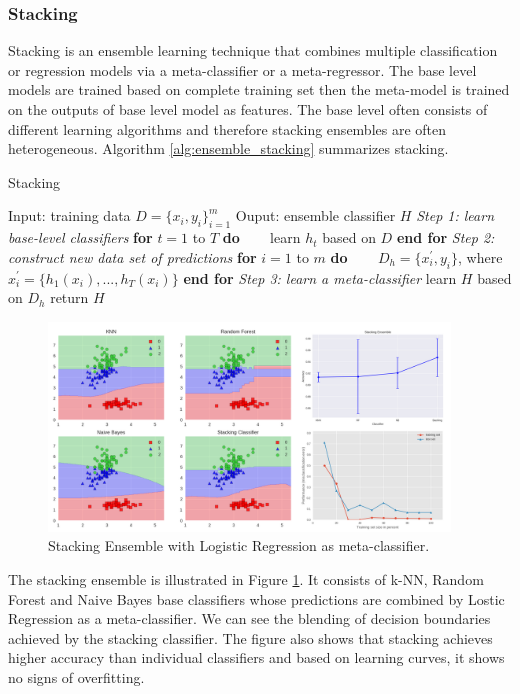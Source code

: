\subsubsection{Stacking}

Stacking is an ensemble learning technique that combines multiple classification or regression models via a meta-classifier or a meta-regressor. The base level models are trained based on complete training set then the meta-model is trained on the outputs of base level model as features. The base level often consists of different learning algorithms and therefore stacking ensembles are often heterogeneous. Algorithm \ref{alg:ensemble_stacking} summarizes stacking. 

\begin{algorithm}
\caption{Stacking}
\label{alg:ensemble_stacking}
\begin{algorithmic}[1]
\STATE Input: training data $D=\{x_i,y_i\}_{i=1}^{m}$
\STATE Ouput: ensemble classifier $H$
\STATE \textit{Step 1: learn base-level classifiers}
\STATE \textbf{for} $t = 1$ to $T$ \textbf{do}  
\STATE ~~~ learn $h_t$ based on $D$
\STATE \textbf{end for} 
\STATE \textit{Step 2: construct new data set of predictions}
\STATE \textbf{for} $i = 1$ to $m$ \textbf{do} 
\STATE ~~~ $D_{h} = \{x_{i}^{\prime}, y_i\}$, where $x_{i}^{\prime}=\{h_1(x_i),...,h_T(x_i)\}$
\STATE \textbf{end for}
\STATE \textit{Step 3: learn a meta-classifier}
\STATE learn $H$ based on $D_h$
\STATE return $H$
\end{algorithmic}
\end{algorithm}


\begin{figure}[tbhp]
    \centering
    \includegraphics[width=0.95\textwidth, trim={10 10 10 10}]{figures/ensemble_stacking_merged.png}
    \caption{Stacking Ensemble with Logistic Regression as meta-classifier.}
    \label{fig:ensemble_stacking}
\end{figure}

The stacking ensemble is illustrated in Figure \ref{fig:ensemble_stacking}. It consists of k-NN, Random Forest and Naive Bayes base classifiers whose predictions are combined by Lostic Regression as a meta-classifier. We can see the blending of decision boundaries achieved by the stacking classifier. The figure also shows that stacking achieves higher accuracy than individual classifiers and based on learning curves, it shows no signs of overfitting.\\ 





